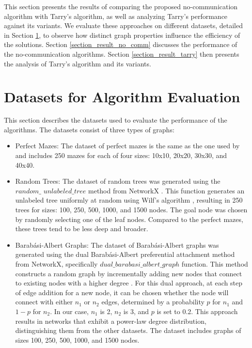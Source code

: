 This section presents the results of comparing the proposed no-communication algorithm with Tarry's algorithm, as well as analyzing Tarry's performance against its variants. We evaluate these approaches on different datasets, detailed in Section \ref{section_datasets}, to observe how distinct graph properties influence the efficiency of the solutions. Section \ref{section_result_no_comm} discusses the performance of the no-communication algorithms. Section \ref{section_result_tarry} then presents the analysis of Tarry's algorithm and its variants.

\section{Datasets for Algorithm Evaluation} 
\label{section_datasets}

This section describes the datasets used to evaluate the performance of the algorithms. The datasets consist of three types of graphs:

\begin{itemize} 
    \item Perfect Mazes: The dataset of perfect mazes \cite{Naeem2021} is the same as the one used by  and includes 250 mazes for each of four sizes: 10x10, 20x20, 30x30, and 40x40.
    \item Random Trees: The dataset of random trees was generated using the $random\_$ $unlabeled\_tree$ method from NetworkX \cite{Hagberg2008}. This function generates an unlabeled tree uniformly at random using Wilf's algorithm \cite{Wilf1981}, resulting in 250 trees for sizes: 100, 250, 500, 1000, and 1500 nodes. The goal node was chosen by randomly selecting one of the leaf nodes. Compared to the perfect mazes, these trees tend to be less deep and broader.
    \item Barabási-Albert Graphs: The dataset of Barabási-Albert graphs was generated using the dual Barabási-Albert preferential attachment method \cite{Moshiri2018} from NetworkX, specifically $dual\_barabasi\_albert\_graph$ function. This method constructs a random graph by incrementally adding new nodes that connect to existing nodes with a higher degree \cite{Barabasi1999}. For this dual approach, at each step of edge addition for a new node, it can be chosen whether the node will connect with either $n_1$ or $n_2$ edges, determined by a probability $p$ for $n_1$ and $1-p$ for $n_2$. In our case, $n_1$ is 2, $n_2$ is 3, and $p$ is set to 0.2. This approach results in networks that exhibit a power-law degree distribution, distinguishing them from the other datasets. The dataset includes graphs of sizes 100, 250, 500, 1000, and 1500 nodes.
\end{itemize}

